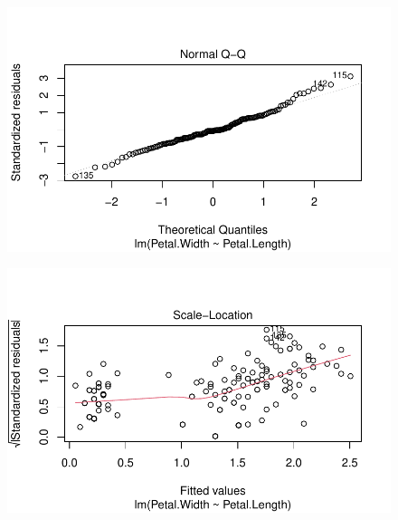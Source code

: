\documentclass[
  letterpaper,
  DIV=11,
  numbers=noendperiod]{scrreprt}
\begin{document}
\begin{figure}[H]

{\centering \includegraphics{modelling_files/figure-pdf/unnamed-chunk-3-2.pdf}

}

\end{figure}

\begin{figure}[H]

{\centering \includegraphics{modelling_files/figure-pdf/unnamed-chunk-3-3.pdf}

}

\end{figure}
\end{document}
